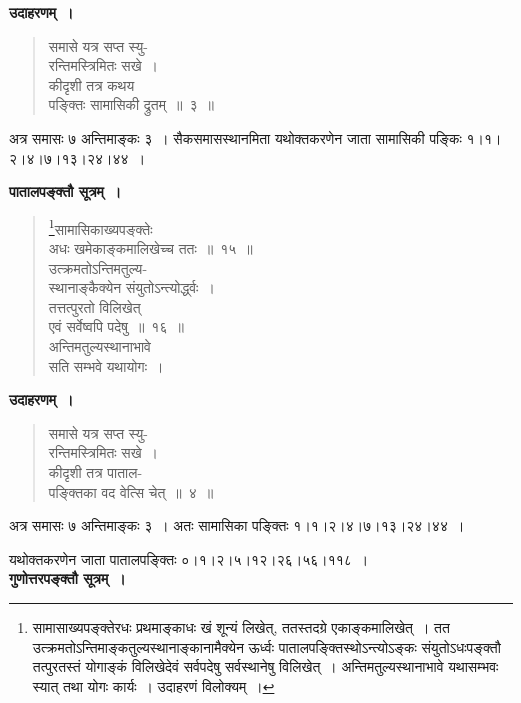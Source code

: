 \documentclass[11pt, openany]{book}
\begin{document}
\textbf{उदाहरणम्~।} 

\begin{quote}
{\ex समासे यत्र सप्त स्यु-\\
रन्तिमस्त्रिमितः सखे~।\\
कीदृशी तत्र कथय\\
पङ्क्तिः सामासिकी द्रुतम्~॥~३~॥}	
\end{quote}

अत्र समासः ७ अन्तिमाङ्कः ३~। सैकसमासस्थानमिता यथोक्तकरणेन जाता सामासिकी पङ्किः १।१।२।४।७।१३।२४।४४~।

\newpage

\textbf{पातालपङ्क्तौ सूत्रम्~।}

 \label{13.15}
\begin{quote}
\renewcommand{\thefootnote}{१}\footnote{सामासाख्यपङ्क्तेरधः प्रथमाङ्काधः खं शून्यं लिखेत्, ततस्तदग्रे एकाङ्कमालिखेत्~। तत उत्क्रमतोऽन्तिमाङ्कतुल्यस्थानाङ्कानामैक्येन ऊर्ध्वः पातालपङ्क्तिस्थोऽन्त्योऽङ्कः संयुतोऽधःपङ्क्तौ तत्पुरतस्तं योगाङ्कं विलिखेदेवं सर्वपदेषु सर्वस्थानेषु विलिखेत्~। अन्तिमतुल्यस्थानाभावे यथासम्भवः स्यात् तथा योगः कार्यः~। उदाहरणं विलोक्यम्~।}{\gk सामासिकाख्यपङ्क्तेः\\
अधः खमेकाङ्कमालिखेच्च ततः~॥~१५~॥\\
उत्क्रमतोऽन्तिमतुल्य-\\
स्थानाङ्कैक्येन संयुतोऽन्त्योर्द्ध्वः~।\\
तत्तत्पुरतो विलिखेत्\\
एवं सर्वेष्वपि पदेषु~॥~१६~॥\\
अन्तिमतुल्यस्थानाभावे\\
सति सम्भवे यथायोगः~।	}
\end{quote}

\textbf{उदाहरणम्~।} 

\begin{quote}
{\ex समासे यत्र सप्त स्यु-\\
रन्तिमस्त्रिमितः सखे~।\\
कीदृशी तत्र पाताल-\\
पङ्क्तिका वद वेत्सि चेत्~॥~४~॥ }
\end{quote}

\newpage

अत्र समासः ७ अन्तिमाङ्कः ३~। अतः सामासिका पङ्क्तिः १।१।२।४।७।१३।२४।४४~।
\vspace{-3mm}

यथोक्तकरणेन जाता पातालपङ्क्तिः ०।१।२।५।१२।२६।५६।११८~।\\ 

\textbf{गुणोत्तरपङ्क्तौ सूत्रम्~।} 
\end{document}
